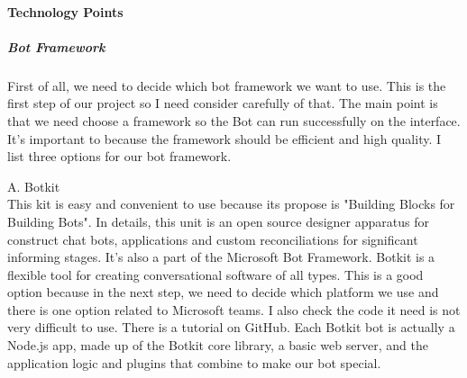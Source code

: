 \paragraph{Technology Points}
\subparagraph{Bot Framework}
 First of all, we need to decide which bot framework we want to use. This is the first step of our project so I need consider carefully of that. The main point is that we need choose a framework so the Bot can run successfully on the interface. It's important to because the framework should be efficient and high quality. I list three options for our bot framework.
 
A. Botkit\\
This kit is easy and convenient to use because its propose is "Building Blocks for Building Bots\cite{botkit}". In details, this unit is an open source designer apparatus for construct chat bots, applications and custom reconciliations for significant informing stages\cite{botkit}. It's also a part of the Microsoft Bot Framework. Botkit is a flexible tool for creating conversational software of all types. This is a good option because in the next step, we need to decide which platform we use and there is one option related to Microsoft teams. I also check the code it need is not very difficult to use. There is a tutorial on GitHub. Each Botkit bot is actually a Node.js app, made up of the Botkit core library, a basic web server, and the application logic and plugins that combine to make our bot special\cite{botkit}. 

